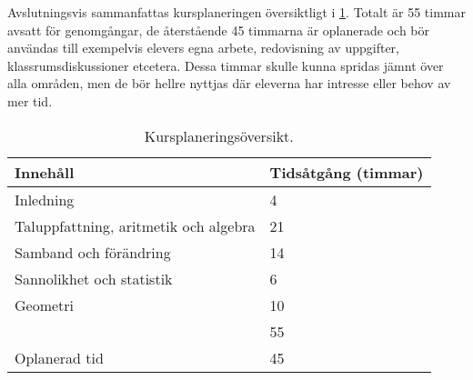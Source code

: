 Avslutningsvis sammanfattas kursplaneringen översiktligt 
i \cref{tbl:sammanfattning}.
Totalt är 55 timmar avsatt för genomgångar, de återstående 45 timmarna är
oplanerade och bör användas till exempelvis elevers egna arbete, redovisning
av uppgifter, klassrumsdiskussioner etcetera.
Dessa timmar skulle kunna spridas jämnt över alla områden, men de bör hellre
nyttjas där eleverna har intresse eller behov av mer tid.

\begin{table}
  \caption{%
    Kursplaneringsöversikt.
  }\label{tbl:sammanfattning}
  \begin{tabular}{ll}
    Innehåll & Tidsåtgång (timmar) \\
    \toprule
    Inledning & 4 \\
    Taluppfattning, aritmetik och algebra & 21 \\
    Samband och förändring & 14 \\
    Sannolikhet och statistik & 6 \\
    Geometri & 10 \\
    \midrule
    & 55 \\
    \bottomrule
    Oplanerad tid & 45 \\
  \end{tabular}
\end{table}


